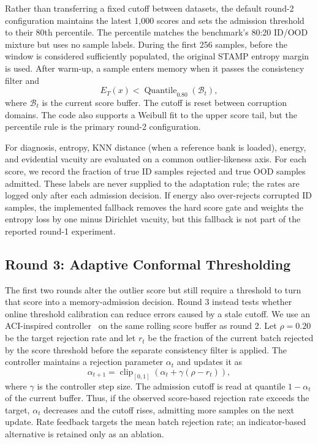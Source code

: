 Rather than transferring a fixed cutoff between datasets, the default round-2
configuration maintains the latest 1,000 scores and sets the admission
threshold to their 80th percentile. The percentile matches the benchmark's
80:20 ID/OOD mixture but uses no sample labels. During the first 256 samples,
before the window is considered sufficiently populated, the original STAMP
entropy margin is used. After warm-up, a sample enters memory when it passes
the consistency filter and
\begin{equation}
    E_T(x) < \operatorname{Quantile}_{0.80}(\mathcal{B}_t),
\end{equation}
where $\mathcal{B}_t$ is the current score buffer. The cutoff is reset between
corruption domains. The code also supports a Weibull fit to the upper score
tail, but the percentile rule is the primary round-2 configuration.

For diagnosis, entropy, KNN distance (when a reference bank is loaded), energy,
and evidential vacuity are evaluated on a common outlier-likeness axis. For
each score, we record the fraction of true ID samples rejected and true OOD
samples admitted. These labels are never supplied to the adaptation rule; the
rates are logged only after each admission decision. If energy also
over-rejects corrupted ID samples, the implemented fallback removes the hard
score gate and weights the entropy loss by one minus Dirichlet vacuity, but
this fallback is not part of the reported round-1 experiment.

\subsection{Round 3: Adaptive Conformal Thresholding}
The first two rounds alter the outlier score but still require a threshold to
turn that score into a memory-admission decision. Round 3 instead tests whether
online threshold calibration can reduce errors caused by a stale cutoff. We use
an ACI-inspired controller~\cite{gibbs2021aci} on the same rolling score buffer
as round 2. Let $\rho=0.20$ be the target rejection rate and let $r_t$ be the
fraction of the current batch rejected by the score threshold before the
separate consistency filter is applied. The controller maintains a rejection
parameter $\alpha_t$ and updates it as
\begin{equation}
    \alpha_{t+1}=\operatorname{clip}_{[0,1]}
    \left(\alpha_t+\gamma(\rho-r_t)\right),
    \label{eq:aci-update}
\end{equation}
where $\gamma$ is the controller step size. The admission cutoff is read at
quantile $1-\alpha_t$ of the current buffer. Thus, if the observed score-based
rejection rate exceeds the target, $\alpha_t$ decreases and the cutoff rises,
admitting more samples on the next update. Rate feedback targets the mean
batch rejection rate; an indicator-based alternative is retained only as an
ablation.


